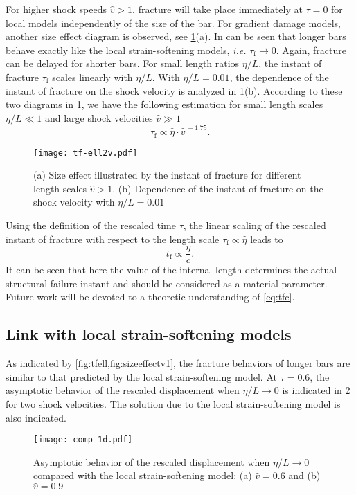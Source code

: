 For higher shock speeds $\widehat{v}>1$, fracture will take place immediately at $\tau=0$ for local models independently of the size of the bar. For gradient damage models, another size effect diagram is observed, see \cref{fig:sizeeffectv1}(a). In can be seen that longer bars behave exactly like the local strain-softening models, \emph{i.e.} $\tau_\mathrm{f}\to 0$. Again, fracture can be delayed for shorter bars. For small length ratios $\eta/L$, the instant of fracture $\tau_\mathrm{f}$ scales linearly with $\eta/L$. With $\eta/L=0.01$, the dependence of the instant of fracture on the shock velocity is analyzed in \cref{fig:sizeeffectv1}(b). According to these two diagrams in \cref{fig:sizeeffectv1}, we have the following estimation for small length scales $\eta/L\ll 1$ and large shock velocities $\widehat{v}\gg 1$
\[
\tau_\mathrm{f}\propto\widehat{\eta}\cdot\widehat{v}^{\,-1.75}.
\]
\begin{figure}[htbp]
\centering
\texttt{[image: tf-ell2v.pdf]}
\caption{(a) Size effect illustrated by the instant of fracture for different length scales $\widehat{v}>1$. (b) Dependence of the instant of fracture on the shock velocity with $\eta/L=0.01$} \label{fig:sizeeffectv1}
\end{figure}

Using the definition of the rescaled time $\tau$, the linear scaling of the rescaled instant of fracture with respect to the length scale $\tau_\mathrm{f}\propto\widehat{\eta}$ leads to
\begin{equation} \label{eq:tfc}
t_\mathrm{f}\propto\frac{\eta}{c}.
\end{equation}
It can be seen that here the value of the internal length determines the actual structural failure instant and should be considered as a material parameter. Future work will be devoted to a theoretic understanding of \eqref{eq:tfc}.

\subsection{Link with local strain-softening models}
As indicated by \cref{fig:tfell,fig:sizeeffectv1}, the fracture behaviors of longer bars are similar to that predicted by the local strain-softening model. At $\tau=0.6$, the asymptotic behavior of the rescaled displacement when $\eta/L\to 0$ is indicated in \cref{fig:comp1d} for two shock velocities. The solution due to the local strain-softening model is also indicated.
\begin{figure}[htbp]
\centering
\texttt{[image: comp\_1d.pdf]}
\caption{Asymptotic behavior of the rescaled displacement when $\eta/L\to 0$ compared with the local strain-softening model: (a) $\widehat{v}=0.6$ and (b) $\widehat{v}=0.9$} \label{fig:comp1d}
\end{figure}

